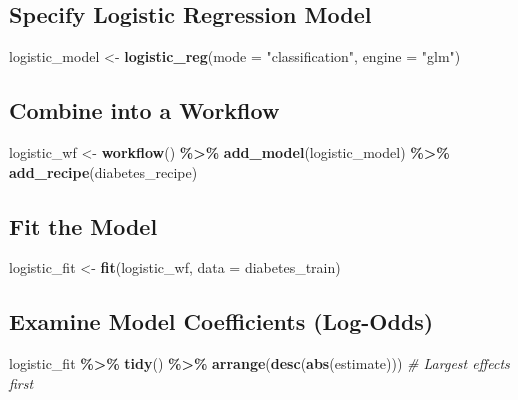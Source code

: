 \documentclass[
]{article}
\newenvironment{Shaded}{\begin{snugshade}}{\end{snugshade}}
\newcommand{\AttributeTok}[1]{\textcolor[rgb]{0.13,0.29,0.53}{#1}}
\newcommand{\CommentTok}[1]{\textcolor[rgb]{0.56,0.35,0.01}{\textit{#1}}}
\newcommand{\FunctionTok}[1]{\textcolor[rgb]{0.13,0.29,0.53}{\textbf{#1}}}
\newcommand{\NormalTok}[1]{#1}
\newcommand{\OtherTok}[1]{\textcolor[rgb]{0.56,0.35,0.01}{#1}}
\newcommand{\SpecialCharTok}[1]{\textcolor[rgb]{0.81,0.36,0.00}{\textbf{#1}}}
\newcommand{\StringTok}[1]{\textcolor[rgb]{0.31,0.60,0.02}{#1}}
\begin{document}
\subsection{Specify Logistic Regression
Model}\label{specify-logistic-regression-model}

\begin{Shaded}
\begin{Highlighting}[]
\NormalTok{logistic\_model }\OtherTok{\textless{}{-}} 
  \FunctionTok{logistic\_reg}\NormalTok{(}\AttributeTok{mode =} \StringTok{"classification"}\NormalTok{, }\AttributeTok{engine =} \StringTok{"glm"}\NormalTok{)}
\end{Highlighting}
\end{Shaded}

\subsection{Combine into a Workflow}\label{combine-into-a-workflow}

\begin{Shaded}
\begin{Highlighting}[]
\NormalTok{logistic\_wf }\OtherTok{\textless{}{-}} 
  \FunctionTok{workflow}\NormalTok{() }\SpecialCharTok{\%\textgreater{}\%}
  \FunctionTok{add\_model}\NormalTok{(logistic\_model) }\SpecialCharTok{\%\textgreater{}\%}
  \FunctionTok{add\_recipe}\NormalTok{(diabetes\_recipe)}
\end{Highlighting}
\end{Shaded}

\subsection{Fit the Model}\label{fit-the-model}

\begin{Shaded}
\begin{Highlighting}[]
\NormalTok{logistic\_fit }\OtherTok{\textless{}{-}} 
  \FunctionTok{fit}\NormalTok{(logistic\_wf, }\AttributeTok{data =}\NormalTok{ diabetes\_train)}
\end{Highlighting}
\end{Shaded}

\subsection{Examine Model Coefficients
(Log-Odds)}\label{examine-model-coefficients-log-odds}

\begin{Shaded}
\begin{Highlighting}[]
\NormalTok{logistic\_fit }\SpecialCharTok{\%\textgreater{}\%}
  \FunctionTok{tidy}\NormalTok{() }\SpecialCharTok{\%\textgreater{}\%}
  \FunctionTok{arrange}\NormalTok{(}\FunctionTok{desc}\NormalTok{(}\FunctionTok{abs}\NormalTok{(estimate)))  }\CommentTok{\# Largest effects first}
\end{Highlighting}
\end{Shaded}
\end{document}
